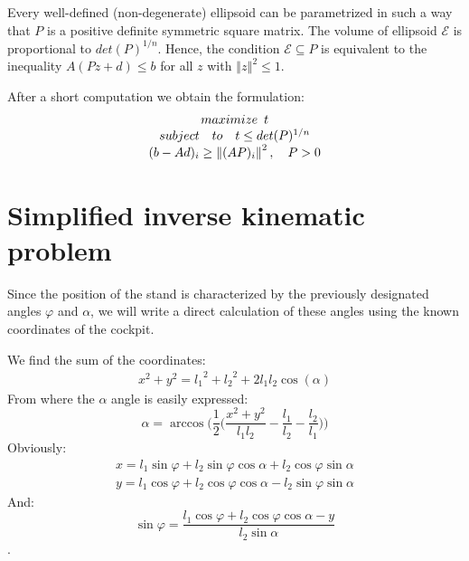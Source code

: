 \documentclass[journal,twocolumn]{IEEEtran}
\begin{document}
Every well-defined (non-degenerate) ellipsoid can be parametrized in such a way that $P$ is a positive definite symmetric square matrix. The volume of ellipsoid $\mathcal{E}$ is proportional to $det(P)^{1/n}$. Hence, the condition $ \mathcal{E} \subseteq P$ is equivalent to the inequality $A(Pz+d) \leq b$ for all $z$ with $\left\Vert z \right\Vert^{2} \leq 1$. 






After a short computation we obtain the formulation:
%
\begin{equation}
    \begin{array}{c}
        maximize \enskip t \\
        subject \quad to \quad t \leq det(P)^{1/n} \\
        (b-Ad)_i \geq \left\Vert (AP)_i \right\Vert^2, \quad P > 0
    \end{array}
\end{equation}

\section{Simplified inverse kinematic problem}

Since the position of the stand is characterized by the previously designated angles $ \varphi $ and $ \alpha $, we will write a direct calculation of these angles using the known coordinates of the cockpit.

We find the sum of the coordinates:
\begin{eqnarray*}
    x^2 + y^2 =  {l_1}^2 + {l_2}^2 + 2l_1l_2\cos(\alpha)
\end{eqnarray*}
From where the $ \alpha $ angle is easily expressed:
\begin{equation}
    \alpha = \arccos\bigg(\frac{1}{2}\Big(\frac{x^2 + y^2}{l_1l_2} - \frac{l_1}{l_2} - \frac{l_2}{l_1}\Big)\bigg)
    \label{eq:alpha}
\end{equation}
Obviously:
\begin{eqnarray*}
    x = l_1 \sin \varphi + l_2 \sin \varphi \cos \alpha + l_2 \cos \varphi \sin \alpha 
    \\
    y = l_1 \cos \varphi + l_2 \cos \varphi \cos \alpha - l_2 \sin \varphi \sin \alpha
\end{eqnarray*}
And:
\begin{equation*}
    \sin \varphi = \frac{l_1 \cos \varphi + l_2 \cos \varphi \cos \alpha - y}{l_2 \sin \alpha}
\end{equation*}.
\end{document}
